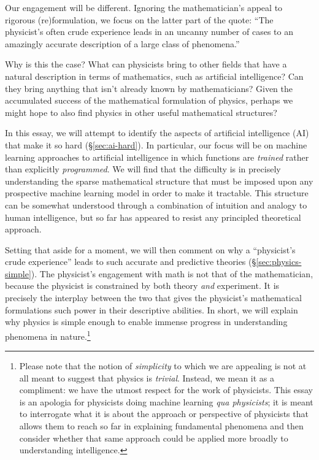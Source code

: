 \documentclass[12pt]{article}
\begin{document}
Our engagement will be different. Ignoring the mathematician's appeal to rigorous (re)formulation, we focus on the latter part of the quote: ``The physicist's often crude experience leads in an uncanny number of cases to an amazingly accurate description of a large class of phenomena.''


Why is this the case? What can physicists bring to other fields that have a natural description in terms of mathematics, such as artificial intelligence? %
Can they bring anything that isn't already known by mathematicians?
Given the accumulated success of the mathematical formulation of physics, perhaps we might hope to also find 
physics in other useful mathematical structures?




In this essay, we will attempt to identify the aspects of artificial intelligence (AI) that make it so hard (\S\ref{sec:ai-hard}). 
In particular, our focus will be on machine learning approaches to artificial intelligence in which functions are \emph{trained} rather than explicitly \emph{programmed}.
We will find that the difficulty is in precisely understanding the sparse mathematical structure 
that must be imposed upon any prospective 
machine learning model in order to make it tractable. This structure can be somewhat understood through a combination of intuition and analogy to human intelligence, but so far has appeared to resist any principled theoretical approach.%

Setting that aside for a moment, we will then comment on why a ``physicist's crude experience'' leads to such accurate %
and predictive theories (\S\ref{sec:physics-simple}). The physicist's engagement with math is not that of the mathematician, because the physicist is constrained by both theory \emph{and} experiment. It is precisely the interplay between the two that gives the physicist's  mathematical formulations such power in their descriptive abilities. In short, we will explain 
why physics is simple enough to enable immense progress in understanding
phenomena in nature.\footnote{
    Please note that the notion of \emph{simplicity} to which we are appealing is not at all meant to suggest that physics is \emph{trivial}. Instead, we mean it as a compliment: we have the utmost respect for the work of physicists. This essay is an apologia for physicists doing machine learning \emph{qua physicists}; it is meant to interrogate what it is about the approach or perspective of physicists that allows them to reach so far in explaining fundamental phenomena and then consider whether that same approach could be applied more broadly to understanding intelligence.
}
\end{document}
